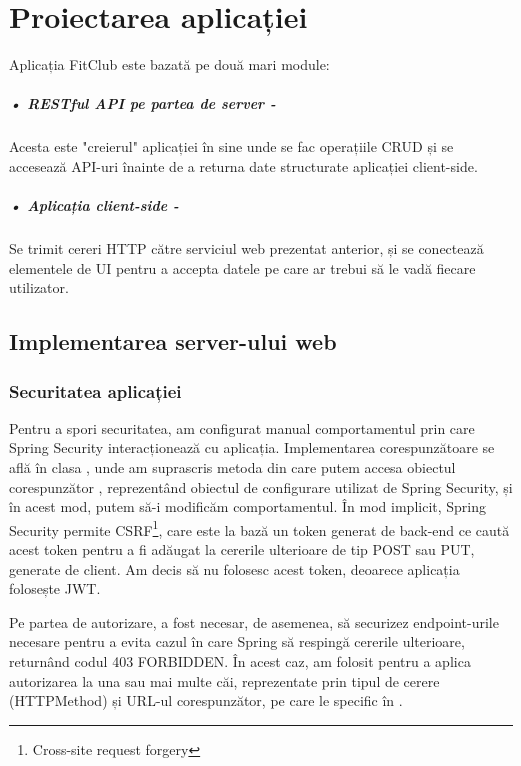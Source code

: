 \chapter{Proiectarea aplicației}
Aplicația FitClub este bazată pe două mari module:

\paragraph{•  RESTful API pe partea de server -}Acesta este "creierul" aplicației în sine unde se fac operațiile CRUD și se accesează API-uri înainte de a returna date structurate aplicației client-side.

\paragraph{•  Aplicația client-side -}Se trimit cereri HTTP către serviciul web prezentat anterior, și se conectează elementele de UI pentru a accepta datele pe care ar trebui să le vadă fiecare utilizator.\newline

\section{Implementarea server-ului web}

\subsection{Securitatea aplicației}
\lstset{frame=tb}

Pentru a spori securitatea, am configurat manual comportamentul prin care Spring Security\cite{.springbootbook} interacționează cu aplicația. Implementarea corespunzătoare se află în clasa , unde am suprascris metoda  din care putem accesa obiectul corespunzător , reprezentând obiectul de configurare utilizat de Spring Security, și în acest mod, putem să-i modificăm comportamentul. În mod implicit, Spring Security permite CSRF\footnote{Cross-site request forgery}, care este la bază un token generat de back-end ce caută acest token pentru a fi adăugat la cererile ulterioare de tip POST sau PUT, generate de client. Am decis să nu folosesc acest token, deoarece aplicația folosește JWT.\newline

Pe partea de autorizare, a fost necesar, de asemenea, să securizez endpoint-urile necesare pentru a evita cazul în care Spring să respingă cererile ulterioare, returnând codul 403 FORBIDDEN.\newline
În acest caz, am folosit  pentru a aplica autorizarea la una sau mai multe căi, reprezentate prin tipul de cerere (HTTPMethod) și URL-ul corespunzător, pe care le specific în .\newline

